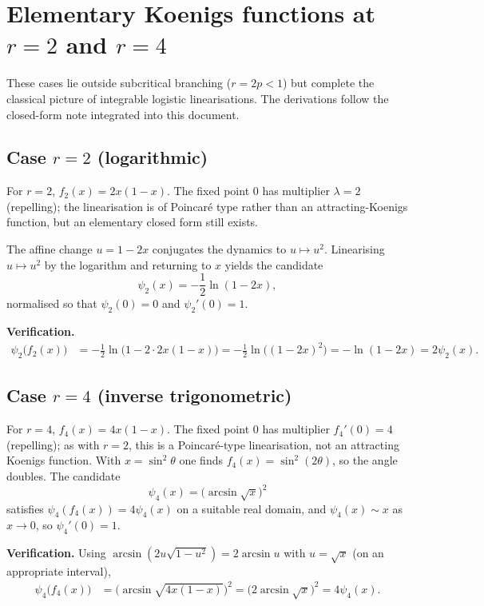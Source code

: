 \section{Elementary Koenigs functions at $r=2$ and $r=4$}
\label{a:app:integrable}
These cases lie outside subcritical branching ($r=2p<1$) but complete the classical picture of integrable logistic linearisations. The derivations follow the closed-form note integrated into this document.

\subsection{Case $r=2$ (logarithmic)}

For $r=2$, $f_2(x)=2x(1-x)$. The fixed point $0$ has multiplier $\lambda=2$ (repelling); the linearisation is of Poincar\'e type rather than an attracting-Koenigs function, but an elementary closed form still exists.

The affine change $u=1-2x$ conjugates the dynamics to $u\mapsto u^2$. Linearising $u\mapsto u^2$ by the logarithm and returning to $x$ yields the candidate
\begin{equation}
\label{a:eq:phi2}
\psi_2(x)=-\frac12\ln(1-2x),
\end{equation}
normalised so that $\psi_2(0)=0$ and $\psi_2'(0)=1$.

\textbf{Verification.}
\begin{align*}
\psi_2\bigl(f_2(x)\bigr)
&=
-\frac12\ln\bigl(1-2\cdot 2x(1-x)\bigr)
=
-\frac12\ln\bigl((1-2x)^2\bigr)
=
-\ln(1-2x)
=
2\psi_2(x).
\end{align*}

\subsection{Case $r=4$ (inverse trigonometric)}

For $r=4$, $f_4(x)=4x(1-x)$. The fixed point $0$ has multiplier $f_4'(0)=4$ (repelling); as with $r=2$, this is a Poincar\'e-type linearisation, not an attracting Koenigs function. With $x=\sin^2\theta$ one finds $f_4(x)=\sin^2(2\theta)$, so the angle doubles. The candidate
\begin{equation}
\label{a:eq:phi4}
\psi_4(x)=\bigl(\arcsin\sqrt{x}\bigr)^2
\end{equation}
satisfies $\psi_4(f_4(x))=4\psi_4(x)$ on a suitable real domain, and $\psi_4(x)\sim x$ as $x\to0$, so $\psi_4'(0)=1$.

\textbf{Verification.}
Using $\arcsin(2u\sqrt{1-u^2})=2\arcsin u$ with $u=\sqrt{x}$ (on an appropriate interval),
\begin{align*}
\psi_4\bigl(f_4(x)\bigr)
&=
\bigl(\arcsin\sqrt{4x(1-x)}\bigr)^2
=
\bigl(2\arcsin\sqrt{x}\bigr)^2
=
4\psi_4(x).
\end{align*}

